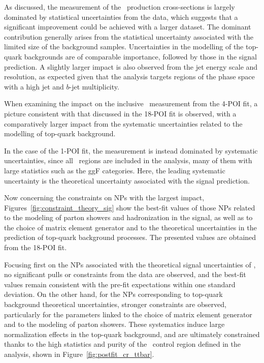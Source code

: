 As discussed, the measurement of the \ttH\ production cross-sections is largely dominated by statistical uncertainties from the data, 
which suggests that a significant improvement could be achieved with a larger dataset. 
The dominant contribution generally arises from the statistical uncertainty associated with the limited size of the background samples. Uncertainties in the modelling of the top-quark backgrounds are of comparable importance, followed by those in the signal prediction. 
A slightly larger impact is also observed from the jet energy scale and resolution, as expected given that the analysis targets regions of the phase space with a high jet and $b$-jet multiplicity.

When examining the impact on the inclusive \ttH\ measurement from the 4-POI fit, a picture consistent with that discussed in the 18-POI fit is observed, with a comparatively larger impact from the systematic uncertainties related to the modelling of top-quark background.

In the case of the 1-POI fit, the measurement is instead dominated by systematic uncertainties, 
since all \htautau\ regions are included in the analysis, many of them with large statistics such as the ggF categories. 
Here, the leading systematic uncertainty is the theoretical uncertainty associated with the signal prediction.

Now concerning the constraints on NPs with the largest impact, 
Figures~\ref{fig:constraint_theory_sig} show the best-fit values of those NPs related to the modeling of parton showers and hadronization in the signal, 
as well as to the choice of matrix element generator and to the theoretical uncertainties in the prediction of top-quark background processes. 
The presented values are obtained from the 18-POI fit. 

Focusing first on the NPs associated with the theoretical signal uncertainties of \ttH, no significant pulls or constraints from the data are observed, 
and the best-fit values remain consistent with the pre-fit expectations within one standard deviation. 
On the other hand, for the NPs corresponding to top-quark background theoretical uncertainties,
stronger constraints are observed, particularly for the parameters linked to the choice of matrix element generator and to the modeling of parton showers. 
These systematics induce large normalization effects in the top-quark background, and are ultimately constrained thanks to the high statistics and purity of the \ttbar\ control region defined in the analysis, shown in Figure~\ref{fig:postfit_cr_ttbar}.

